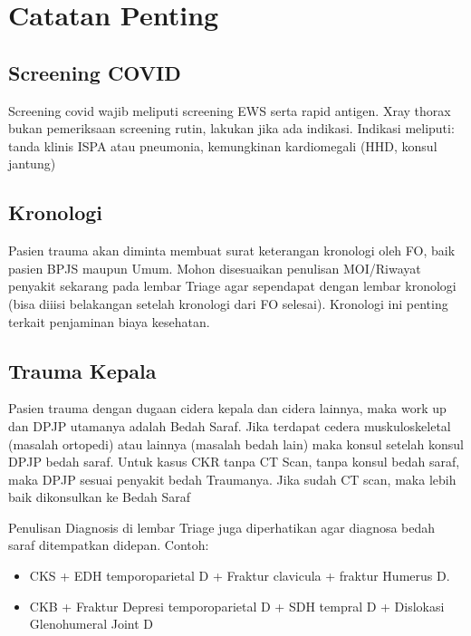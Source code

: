 \documentclass[
]{book}
\providecommand{\tightlist}{%
  \setlength{\itemsep}{0pt}\setlength{\parskip}{0pt}}
\begin{document}
\hypertarget{catatan-penting}{%
\chapter{Catatan Penting}\label{catatan-penting}}

\hypertarget{screening-covid}{%
\section{Screening COVID}\label{screening-covid}}

Screening covid wajib meliputi screening EWS serta rapid antigen. Xray thorax bukan pemeriksaan screening rutin, lakukan jika ada indikasi.
Indikasi meliputi: tanda klinis ISPA atau pneumonia, kemungkinan kardiomegali (HHD, konsul jantung)

\hypertarget{kronologi}{%
\section{Kronologi}\label{kronologi}}

Pasien trauma akan diminta membuat surat keterangan kronologi oleh FO, baik pasien BPJS maupun Umum.
Mohon disesuaikan penulisan MOI/Riwayat penyakit sekarang pada lembar Triage agar sependapat dengan lembar kronologi (bisa diiisi belakangan setelah kronologi dari FO selesai).
Kronologi ini penting terkait penjaminan biaya kesehatan.

\hypertarget{trauma-kepala}{%
\section{Trauma Kepala}\label{trauma-kepala}}

Pasien trauma dengan dugaan cidera kepala dan cidera lainnya, maka work up dan DPJP utamanya adalah Bedah Saraf. Jika terdapat cedera muskuloskeletal (masalah ortopedi) atau lainnya (masalah bedah lain) maka konsul setelah konsul DPJP bedah saraf. Untuk kasus CKR tanpa CT Scan, tanpa konsul bedah saraf, maka DPJP sesuai penyakit bedah Traumanya. Jika sudah CT scan, maka lebih baik dikonsulkan ke Bedah Saraf

Penulisan Diagnosis di lembar Triage juga diperhatikan agar diagnosa bedah saraf ditempatkan didepan. Contoh:

\begin{itemize}
\tightlist
\item
  CKS + EDH temporoparietal D + Fraktur clavicula + fraktur Humerus D.
\item
  CKB + Fraktur Depresi temporoparietal D + SDH tempral D + Dislokasi Glenohumeral Joint D
\end{itemize}
\end{document}
